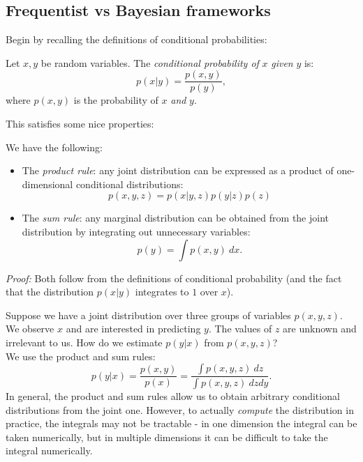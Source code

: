 \subsection{Frequentist vs Bayesian frameworks}
Begin by recalling the definitions of conditional probabilities:
\begin{framedef}
Let $x,y$ be random variables. The \textit{conditional probability of} $x$ \textit{given} $y$ is:
\begin{equation*}
p(x|y) = \frac{p(x,y)}{p(y)},
\end{equation*}
where $p(x,y)$ is the probability of $x$ \textit{and} $y$.
\end{framedef}
This satisfies some nice properties:
\begin{frameprop}
We have the following:
\begin{itemize}
\item The \textit{product rule}: any joint distribution can be expressed as a product of one-dimensional conditional distributions:
\begin{equation*}
p(x,y,z) = p(x|y,z) p(y|z) p(z)
\end{equation*}
\item The \textit{sum rule}: any marginal distribution can be obtained from the joint distribution by integrating out unnecessary variables:
\begin{equation*}
p(y) = \int p(x,y)\ dx.
\end{equation*}
\end{itemize}
\textit{Proof:} Both follow from the definitions of conditional probability (and the fact that the distribution $p(x|y)$ integrates to $1$ over $x$).
\end{frameprop}

\begin{frameex}
Suppose we have a joint distribution over three groups of variables $p(x,y,z)$. We observe $x$ and are interested in predicting $y$. The values of $z$ are unknown and irrelevant to us. How do we estimate $p(y|x)$ from $p(x,y,z)$?\\

We use the product and sum rules:
\begin{equation*}
p(y|x) = \frac{p(x,y)}{p(x)} = \frac{\displaystyle \int p(x,y,z)\ dz}{\displaystyle \int p(x,y,z)\ dz dy}.
\end{equation*}
In general, the product and sum rules allow us to obtain arbitrary conditional distributions from the joint one. However, to actually \textit{compute} the distribution in practice, the integrals may not be tractable - in one dimension the integral can be taken numerically, but in multiple dimensions it can be difficult to take the integral numerically.
\end{frameex}




